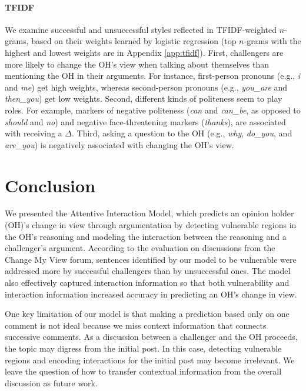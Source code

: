 \documentclass[11pt,a4paper]{article}
\begin{document}
\paragraph{TFIDF} 
We examine successful and unsuccessful styles reflected in TFIDF-weighted $n$-grams, based on their weights learned by logistic regression (top $n$-grams with the highest and lowest weights are in Appendix \ref{app:tfidf}). First, challengers are more likely to change the OH's view when talking about themselves than mentioning the OH in their arguments. For instance, first-person pronouns (e.g., \emph{i} and \emph{me}) get high weights, whereas second-person pronouns (e.g., \emph{you\_are} and \emph{then\_you}) get low weights. Second, different kinds of politeness seem to play roles. For example, markers of negative politeness (\emph{can} and \emph{can\_be}, as opposed to \emph{should} and \emph{no}) and negative face-threatening markers (\emph{thanks}), are associated with receiving a $\Delta$. Third, asking a question to the OH (e.g., \emph{why}, \emph{do\_you}, and \emph{are\_you}) is negatively associated with changing the OH's view.


\section{Conclusion\label{sec:conclusion}}
We presented the Attentive Interaction Model, which predicts an opinion holder (OH)'s change in view through argumentation by detecting vulnerable regions in the OH's reasoning and modeling the interaction between the reasoning and a challenger's argument. According to the evaluation on discussions from the Change My View forum, sentences identified by our model to be vulnerable were addressed more by successful challengers than by unsuccessful ones. The model also effectively captured interaction information so that both vulnerability and interaction information increased accuracy in predicting an OH's change in view.

One key limitation of our model is that making a prediction based only on one comment is not ideal because we miss context information that connects successive comments. As a discussion between a challenger and the OH proceeds, the topic may digress from the initial post. In this case, detecting vulnerable regions and encoding interactions for the initial post may become irrelevant. We leave the question of how to transfer contextual information from the overall discussion as future work.
\end{document}
